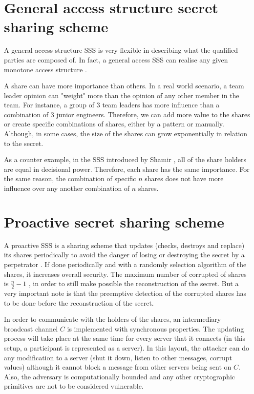 \documentclass[12pt, a4paper, oneside]{book}
\begin{document}
    \section{General access structure secret sharing scheme}
    A general access structure SSS is very flexible in describing what the qualified parties are composed of. In fact, a general access SSS can realise any given monotone access structure \cite{GeneralSSS}.
    
    A share can have more importance than others. In a real world scenario, a team leader opinion can "weight" more than the opinion of any other member in the team. For instance, a group of 3 team leaders has more influence than a combination of 3 junior engineers. Therefore, we can add more value to the shares or create specific combinations of shares, either by a pattern or manually. Although, in some cases, the size of the shares can grow exponentially in relation to the secret.
    
    As a counter example, in the SSS introduced by Shamir \cite{ShareASecret}, all of the share holders are equal in decisional power. Therefore, each share has the same importance. For the same reason, the combination of specific $n$ shares does not have more influence over any another combination of $n$ shares.
    \section{Proactive secret sharing scheme} 
    A proactive SSS is a sharing scheme that updates (checks, destroys and replace) its shares periodically to avoid the danger of losing or destroying the secret by a perpetrator \cite{PSSS}.
    If done periodically and with a randomly selection algorithm of the shares, it increases overall security. The maximum number of corrupted of shares is $\tfrac{n}{2} {-} 1$ \cite{PSSS}, in order to still make possible the reconstruction of the secret. But a very important note is that the preemptive detection of the corrupted shares has to be done before the reconstruction of the secret.
    
    In order to communicate with the holders of the shares, an intermediary broadcast channel $C$ is implemented with synchronous properties. The updating process will take place at the same time for every server that it connects (in this setup, a participant is represented as a server).
    In this layout, the attacker can do any modification to a server (shut it down, listen to other messages, corrupt values) although it cannot block a message from other servers being sent on $C$. Also, the adversary is computationally bounded and any other cryptographic primitives are not to be considered vulnerable.
    
\end{document}

